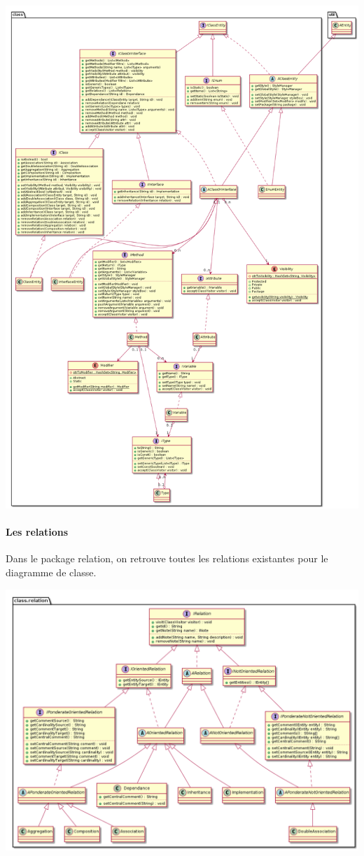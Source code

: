 \documentclass[a4paper,10pt]{article}
\begin{document}
	\begin{center}
	  \includegraphics[width=14cm]{Image/classe.png}
	\end{center}
	
	\newpage
	\paragraph{Les relations}
	Dans le package relation, on retrouve toutes les relations existantes pour le diagramme de classe. 
	\begin{center}
	  \includegraphics[width=14cm]{Image/classRelation.png}
	\end{center}
\end{document}
